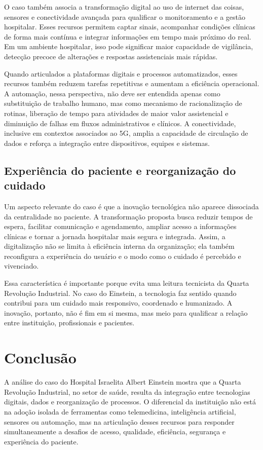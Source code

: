 \documentclass[12pt,a4paper]{article}
\begin{document}
O caso também associa a transformação digital ao uso de internet das coisas, sensores e conectividade avançada para qualificar o monitoramento e a gestão hospitalar. Esses recursos permitem captar sinais, acompanhar condições clínicas de forma mais contínua e integrar informações em tempo mais próximo do real. Em um ambiente hospitalar, isso pode significar maior capacidade de vigilância, detecção precoce de alterações e respostas assistenciais mais rápidas.

Quando articulados a plataformas digitais e processos automatizados, esses recursos também reduzem tarefas repetitivas e aumentam a eficiência operacional. A automação, nessa perspectiva, não deve ser entendida apenas como substituição de trabalho humano, mas como mecanismo de racionalização de rotinas, liberação de tempo para atividades de maior valor assistencial e diminuição de falhas em fluxos administrativos e clínicos. A conectividade, inclusive em contextos associados ao 5G, amplia a capacidade de circulação de dados e reforça a integração entre dispositivos, equipes e sistemas.

\subsection{Experiência do paciente e reorganização do cuidado}
\label{sec:orga79a2ff}

Um aspecto relevante do caso é que a inovação tecnológica não aparece dissociada da centralidade no paciente. A transformação proposta busca reduzir tempos de espera, facilitar comunicação e agendamento, ampliar acesso a informações clínicas e tornar a jornada hospitalar mais segura e integrada. Assim, a digitalização não se limita à eficiência interna da organização; ela também reconfigura a experiência do usuário e o modo como o cuidado é percebido e vivenciado.

Essa característica é importante porque evita uma leitura tecnicista da Quarta Revolução Industrial. No caso do Einstein, a tecnologia faz sentido quando contribui para um cuidado mais responsivo, coordenado e humanizado. A inovação, portanto, não é fim em si mesma, mas meio para qualificar a relação entre instituição, profissionais e pacientes.

\section{Conclusão}
\label{sec:org0b6490a}

A análise do caso do Hospital Israelita Albert Einstein mostra que a Quarta Revolução Industrial, no setor de saúde, resulta da integração entre tecnologias digitais, dados e reorganização de processos. O diferencial da instituição não está na adoção isolada de ferramentas como telemedicina, inteligência artificial, sensores ou automação, mas na articulação desses recursos para responder simultaneamente a desafios de acesso, qualidade, eficiência, segurança e experiência do paciente.
\end{document}
